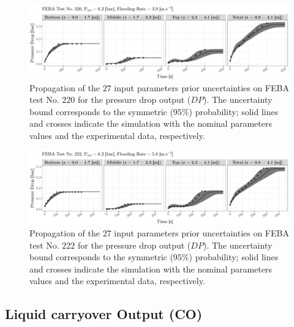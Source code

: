 \begin{figure}[bth]
    \centering
    \includegraphics[width=1.0\textwidth]{../figures/chapter2/figures/plotTraceUQPriorDP220}
    \caption[Propagation of the $27$ input parameters prior uncertainties on FEBA test No. $220$ for the pressure drop output ($DP$).]{Propagation of the $27$ input parameters prior uncertainties on FEBA test No. $220$ for the pressure drop output ($DP$). The uncertainty bound corresponds to the symmetric ($95\%$) probability; solid lines and crosses indicate the simulation with the nominal parameters values and the experimental data, respectively.}
    \label{fig:ch2_plot_trace_uq_prior_dp_220}
\end{figure}

\begin{figure}[!h]
    \centering
    \includegraphics[width=1.0\textwidth]{../figures/chapter2/figures/plotTraceUQPriorDP222}
    \caption[Propagation of the $27$ input parameters prior uncertainties on FEBA test No. $222$ for the pressure drop output ($DP$).]{Propagation of the $27$ input parameters prior uncertainties on FEBA test No. $222$ for the pressure drop output ($DP$). The uncertainty bound corresponds to the symmetric ($95\%$) probability; solid lines and crosses indicate the simulation with the nominal parameters values and the experimental data, respectively.}
    \label{fig:ch2_plot_trace_uq_prior_dp_222}
\end{figure}

\clearpage

\subsection{Liquid carryover Output (CO)}\label{app:tbl_results_uq_feba_co}

